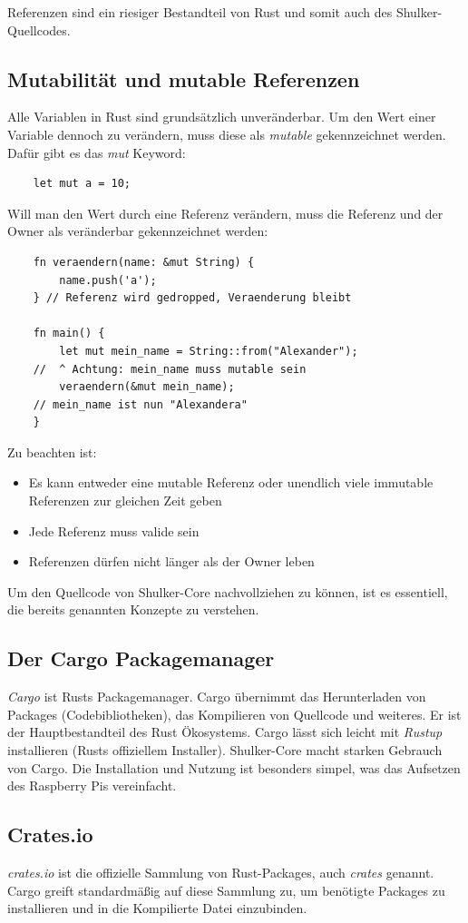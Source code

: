 Referenzen sind ein riesiger Bestandteil von Rust und somit auch des Shulker-Quellcodes.

\subsection{Mutabilität und mutable Referenzen}
Alle Variablen in Rust sind grundsätzlich unveränderbar. Um den Wert einer Variable dennoch zu verändern,
muss diese als \textit{mutable} gekennzeichnet werden. Dafür gibt es das \textit{mut} Keyword:
\begin{lstlisting}
    let mut a = 10;
\end{lstlisting}
Will man den Wert durch eine Referenz verändern, muss die Referenz und der Owner als veränderbar gekennzeichnet werden:
\begin{lstlisting}
    fn veraendern(name: &mut String) {
        name.push('a');
    } // Referenz wird gedropped, Veraenderung bleibt

    fn main() {
        let mut mein_name = String::from("Alexander");
    //  ^ Achtung: mein_name muss mutable sein
        veraendern(&mut mein_name);
    // mein_name ist nun "Alexandera"
    }
\end{lstlisting}
Zu beachten ist:
\begin{itemize}
    \item Es kann entweder eine mutable Referenz oder unendlich viele immutable Referenzen zur gleichen Zeit geben
    \item Jede Referenz muss valide sein
    \item Referenzen dürfen nicht länger als der Owner leben
\end{itemize}
Um den Quellcode von Shulker-Core nachvollziehen zu können, ist es essentiell, die bereits genannten Konzepte zu verstehen.

\subsection{Der Cargo Packagemanager}
\textit{Cargo} ist Rusts Packagemanager. Cargo übernimmt das Herunterladen von Packages (Codebibliotheken), das Kompilieren von Quellcode und weiteres.
Er ist der Hauptbestandteil des Rust Ökosystems. Cargo lässt sich leicht mit \textit{Rustup} installieren (Rusts offiziellem Installer). Shulker-Core macht
starken Gebrauch von Cargo. Die Installation und Nutzung ist besonders simpel, was das Aufsetzen des Raspberry Pis vereinfacht.

\subsection{Crates.io}
\textit{crates.io} ist die offizielle Sammlung von Rust-Packages, auch \textit{crates} genannt. Cargo greift standardmäßig auf diese 
Sammlung zu, um benötigte Packages zu installieren und in die Kompilierte Datei einzubinden.